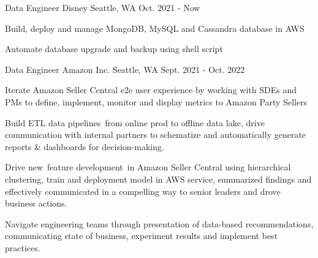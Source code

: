 



\begin{cventries}


	\cventry
	{Data Engineer} %
	{Disney} %
	{Seattle, WA} %
	{Oct. 2021 - Now} %
	{
		\begin{cvitems}
			\item{Build, deploy and manage MongoDB, MySQL and Cassandra database in AWS}
			\item{Automate database upgrade and backup using shell script}			
		\end{cvitems}
	}


	\cventry
	{Data Engineer} %
	{Amazon Inc.} %
	{Seattle, WA} %
	{Sept. 2021 - Oct. 2022} %
	{
		\begin{cvitems}
			\item{Iterate Amazon Seller Central e2e user experience by working with SDEs and PMs to define, implement, monitor and display metrics to Amazon  Party Sellers}
			\item{Build ETL data pipelines from online prod to offline data lake, drive communication with internal partners to schematize and automatically generate reports \& dashboards for decision-making.}
			\item{Drive new feature development in Amazon Seller Central using hierarchical clustering, train and deployment model in AWS service, summarized findings and effectively communicated in a compelling way to senior leaders and drove business actions.}
			\item{Navigate engineering teams through presentation of data-based recommendations, communicating state of business, experiment results and implement best practices.}
		\end{cvitems}
	}



\end{cventries}

